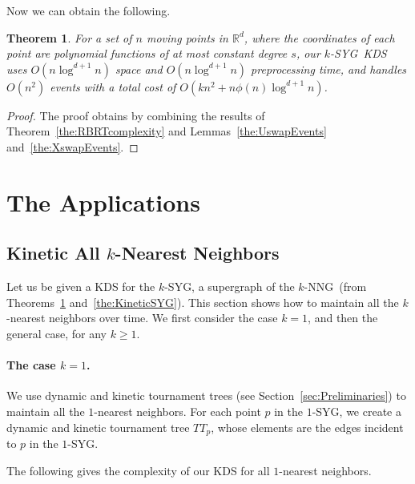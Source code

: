 \documentclass[preprint,12pt]{elsarticle}
\def\knng{\mbox{$k$-NNG}}
\def\ksyg{\mbox{$k$-SYG}}
\def\1syg{\mbox{$1$-SYG}}
\newtheorem{theorem}{Theorem}[section]
\begin{document}
Now we can obtain the following.
\begin{theorem}\label{the:KinetickSYG}
For a set of $n$ moving points in $\mathbb{R}^d$, where the coordinates of each point are polynomial functions of at most constant degree $s$, our \ksyg~KDS uses $O(n\log^{d+1} n)$ space and $O(n\log^{d+1} n)$ preprocessing time, and handles $O(n^2)$ events with a total cost of $O(kn^2 + n\phi(n)\log^{d+1}n)$.
\end{theorem}
\begin{proof}
The proof obtains by combining the results of Theorem~\ref{the:RBRTcomplexity} and Lemmas~\ref{the:UswapEvents} and~\ref{the:XswapEvents}.
\end{proof}
\section{The Applications}\label{sec:applications}
\subsection{Kinetic All $k$-Nearest Neighbors}\label{sec:app_kNNs}
Let us be given a KDS for the \ksyg, a supergraph of the \knng~(from Theorems~\ref{the:KinetickSYG} and~\ref{the:KineticSYG}). This section shows how to maintain all the $k$-nearest neighbors over time. We first consider the case $k=1$, and then the general case, for any $k\geq 1$.


\paragraph{The case $k=1$.}\label{sec:KDSfor1NNs}
We use dynamic and kinetic tournament trees (see Section~\ref{sec:Preliminaries}) to maintain all the $1$-nearest neighbors. For each point $p$ in the \1syg, we create a dynamic and kinetic tournament tree $TT_p$, whose elements are the edges incident to $p$ in the \1syg. 

The following gives the complexity of our KDS for all $1$-nearest neighbors.
\end{document}
